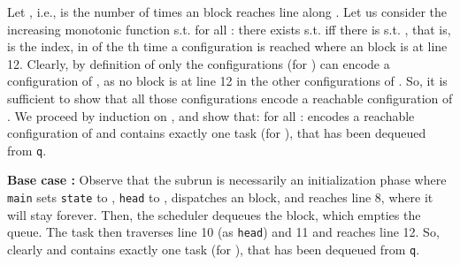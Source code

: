 \documentclass[runningheads,oribibl,]{article}
\newenvironment{proof}{\noindent{\it Proof.\hspace*{.5cm}}}{}
\begin{document}
\begin{proof}
  Let
  , i.e.,  is the number of times an
   block reaches line  along . Let us consider the
  increasing monotonic function
   s.t. for all : there exists 
  s.t.  iff there is  s.t. , that is,  is the index,
  in  of the th time a configuration is reached where an
   block is at line 12. Clearly, by definition of 
  only the  configurations (for
  ) can encode a configuration of , as no  block
  is at line 12 in the other configurations of . So, it is
  sufficient to show that all those
   configurations encode a
  reachable configuration of . We proceed by induction on , and
  show that: for all :
   encodes a reachable
  configuration of  and  contains exactly one 
  task (for ), that has been dequeued from
  \texttt{q}.

  \textbf{Base case :} Observe that the subrun
   is necessarily an
  initialization phase where \texttt{main} sets \texttt{state} to
  , \texttt{head} to , dispatches an  block, and
  reaches line 8, where it will stay forever. Then, the scheduler
  dequeues the  block, which empties the queue. The  task then
  traverses line 10 (as \texttt{head}) and 11 and reaches line
  12. So, clearly 
  and contains exactly one  task (for ), that has
  been dequeued from \texttt{q}.



\end{proof}
\end{document}
